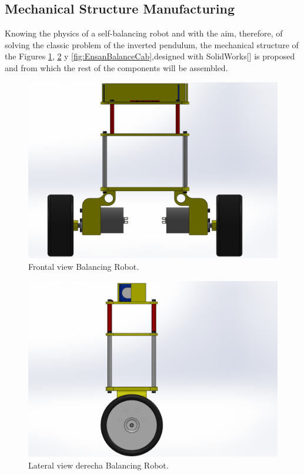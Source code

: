 \subsection{Mechanical Structure Manufacturing}
Knowing the physics of a self-balancing robot \cite{6845943} \cite{7112017} and with the aim, therefore, of solving the classic problem of the inverted pendulum, the mechanical structure of the Figures \ref{fig:EnsanBalanceFront}, \ref{fig:EnsanBalanceLateral} y \ref{fig:EnsanBalanceCab},designed with SolidWorks[] is proposed and from which the rest of the components will be assembled.

\begin{center}
	\begin{figure}[H]
		\center
		\includegraphics[trim = 1cm 0mm 2.7cm 0mm,clip, angle=0, scale = 0.4]{imagenes/Balancing_Robot/EnsanBalanceFront.PDF}
		\caption{Frontal view Balancing Robot.}
		\label{fig:EnsanBalanceFront}
	\end{figure}
\end{center}

\begin{center}
	\begin{figure}[H]
		\center
		\includegraphics[trim = 5cm 0mm 10cm 0mm,clip, angle=0, scale = 0.5]{imagenes/Balancing_Robot/EnsanBalanceLateral.PDF}
		\caption{Lateral view derecha Balancing Robot.}
		\label{fig:EnsanBalanceLateral}
	\end{figure}
\end{center}

